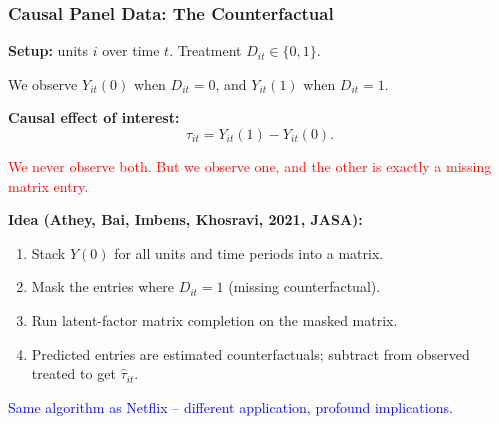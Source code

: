 \documentclass[notes,11pt, aspectratio=169]{beamer}
\begin{document}
\begin{frame}
\frametitle{Causal Panel Data: The Counterfactual}

\textbf{Setup:} units $i$ over time $t$. Treatment $D_{it} \in \{0, 1\}$.

\vspace{4pt}
We observe $Y_{it}(0)$ when $D_{it} = 0$, and $Y_{it}(1)$ when $D_{it} = 1$.

\vspace{6pt}
\textbf{Causal effect of interest:}
\[
    \tau_{it} = Y_{it}(1) - Y_{it}(0).
\]

\textcolor{red}{We never observe both. But we observe one, and the other is exactly a missing matrix entry.}

\vspace{8pt}
\textbf{Idea (Athey, Bai, Imbens, Khosravi, 2021, JASA):}
\begin{enumerate}
    \item Stack $Y(0)$ for all units and time periods into a matrix.
    \item Mask the entries where $D_{it} = 1$ (missing counterfactual).
    \item Run latent-factor matrix completion on the masked matrix.
    \item Predicted entries are estimated counterfactuals; subtract from observed treated to get $\hat\tau_{it}$.
\end{enumerate}

\vspace{4pt}
\textcolor{blue}{Same algorithm as Netflix -- different application, profound implications.}
\end{frame}
\end{document}
